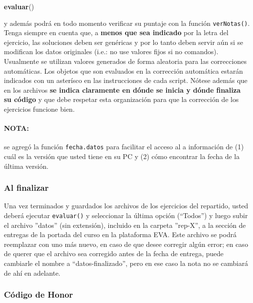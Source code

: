 \documentclass[]{article}
\newenvironment{Shaded}{}{}
\newcommand{\KeywordTok}[1]{\textcolor[rgb]{0.00,0.44,0.13}{\textbf{{#1}}}}
\newcommand{\NormalTok}[1]{{#1}}
\begin{document}
\begin{Shaded}
\begin{Highlighting}[]
\KeywordTok{evaluar}\NormalTok{()}
\end{Highlighting}
\end{Shaded}
y además podrá en todo momento verificar su puntaje con la función
\texttt{verNotas()}. Tenga siempre en cuenta que, a \textbf{menos que
sea indicado} por la letra del ejercicio, las soluciones deben ser
genéricas y por lo tanto deben servir aún si se modifican los datos
originales (i.e.: no use valores fijos si no comandos). Usualmente se
utilizan valores generados de forma aleatoria para las correcciones
automáticas. Los objetos que son evaluados en la corrección automática
estarán indicados con un asterísco en las instrucciones de cada script.
Nótese además que en los archivos \textbf{se indica claramente en dónde
se inicia y dónde finaliza su código} y que debe respetar esta
organización para que la corrección de los ejercicios funcione bien.

\paragraph{NOTA:}

se agregó la función \texttt{fecha.datos} para facilitar el acceso al a
información de (1) cuál es la versión que usted tiene en su PC y (2)
cómo encontrar la fecha de la última versión.

\subsubsection{Al finalizar}

Una vez terminados y guardados los archivos de los ejercicios del
repartido, usted deberá ejecutar \texttt{evaluar()} y seleccionar la
última opción (``Todos'') y luego subir el archivo ''datos'' (sin
extensión), incluido en la carpeta ''rep-X'', a la sección de entregas
de la portada del curso en la plataforma EVA. Este archivo se podrá
reemplazar con uno más nuevo, en caso de que desee corregir algún error;
en caso de querer que el archivo sea corregido antes de la fecha de
entrega, puede cambiarle el nombre a ``datos-finalizado'', pero en ese
caso la nota no se cambiará de ahí en adelante.

\subsubsection{Código de Honor}
\end{document}
